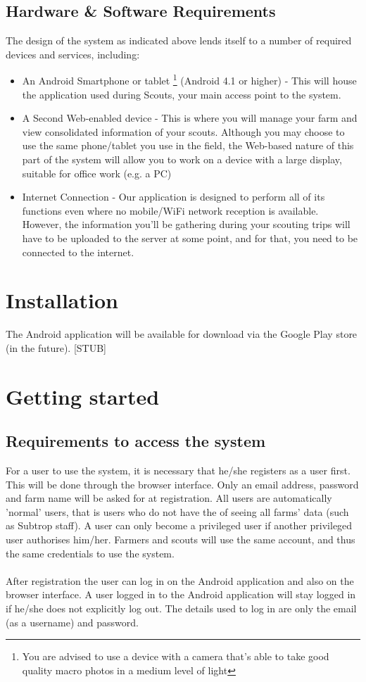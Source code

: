 \documentclass[11pt,a4paper,titlepage]{article}
\begin{document}
\subsection{Hardware \& Software Requirements}
The design of the system as indicated above lends itself to a number of required devices and services, including:
	\begin{itemize}
		\item An Android Smartphone or tablet \footnote{You are advised to use a device with a camera that's able to take good quality macro photos in a medium level of light} (Android 4.1 or higher) - This will house the application used during Scouts, your main access point to the system.
		\item A Second Web-enabled device - This is where you will manage your farm and view consolidated information of your scouts. Although you may choose to use the same phone/tablet you use in the field, the Web-based nature of this part of the system will allow you to work on a device with a large display, suitable for office work (e.g. a PC)
		\item Internet Connection - Our application is designed to perform all of its functions even where no mobile/WiFi network reception is available. However, the information you'll be gathering during your scouting trips will have to be uploaded to the server at some point, and for that, you need to be connected to the internet. 
	\end{itemize}



\section{Installation}
The Android application will be available for download via the Google Play store (in the future).
[STUB]
		
\section{Getting started}
\subsection{Requirements to access the system}
For a user to use the system, it is necessary that he/she registers as a user first. This will be done through the browser interface. Only an email address, password and farm name will be asked for at registration. All users are automatically 'normal' users, that is users who do not have the  of seeing all farms' data (such as Subtrop staff). A user can only become a privileged user if another privileged user authorises him/her. Farmers and scouts will use the same account, and thus the same credentials to use the system.\\\\
After registration the user can log in on the Android application and also on the browser interface. A user logged in to the Android application will stay logged in if he/she does not explicitly log out. The details used to log in are only the email (as a username) and password.
\end{document}
